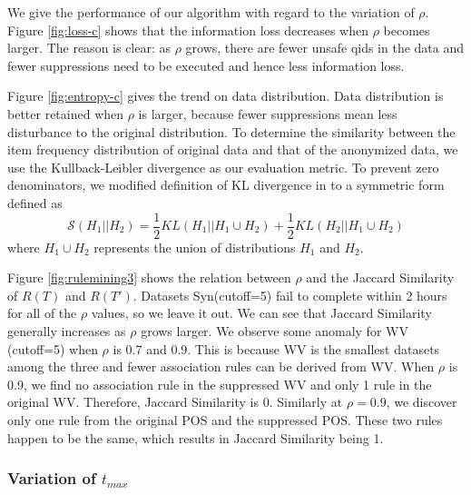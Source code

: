 We give the performance of our
algorithm with regard to the variation of $\rho$.
Figure \ref{fig:loss-c} shows that
the information loss decreases when $\rho$ becomes larger.
The reason is clear: as $\rho$ grows,
there are fewer unsafe qids in the data and
fewer suppressions need to be executed and 
hence less information loss. 

Figure \ref{fig:entropy-c} gives the trend on data distribution. 
Data distribution is better retained when $\rho$ is larger, 
because fewer suppressions mean less disturbance to the original distribution.
To determine the similarity between the item frequency distribution
of original data and that of the anonymized data,
we use the Kullback-Leibler divergence as our evaluation metric.
To prevent zero denominators, we modified  definition of KL divergence 
in  
to a symmetric form \cite{Fisher:2008:DSF} defined as
\[\mathcal{S}(H_1||H_2)=\frac{1}{2}KL( H_1||H_1 \cup H_2)+\frac{1}{2} KL( H_2||H_1 \cup H_2)\]
where  $H_1 \cup H_2$ represents the union of distributions $H_1$ and $H_2$.

Figure \ref{fig:rulemining3} shows the relation between $\rho$ and 
the Jaccard Similarity of $R(T)$ and $R(T')$. 
Datasets Syn(cutoff=5) fail to complete within 2 hours for all of the $\rho$
values, so we leave it out. 
We can see that Jaccard Similarity generally increases as $\rho$ grows larger. 
We observe some anomaly for WV (cutoff=5) when $\rho$ is 0.7 and 0.9. 
This is because WV is the smallest datasets
among the three and fewer association rules can be derived from WV.  
When $\rho$ is 0.9, we find no association rule in the suppressed WV
and only 1 rule in the original WV. Therefore, Jaccard Similarity is 0. 
Similarly at $\rho=0.9$, we discover only one rule from the original POS and the
suppressed POS. These two rules happen to be the same, which results in
Jaccard Similarity being 1.

\subsubsection{Variation of $t_{max}$}\label{sec:eval:timebound}


